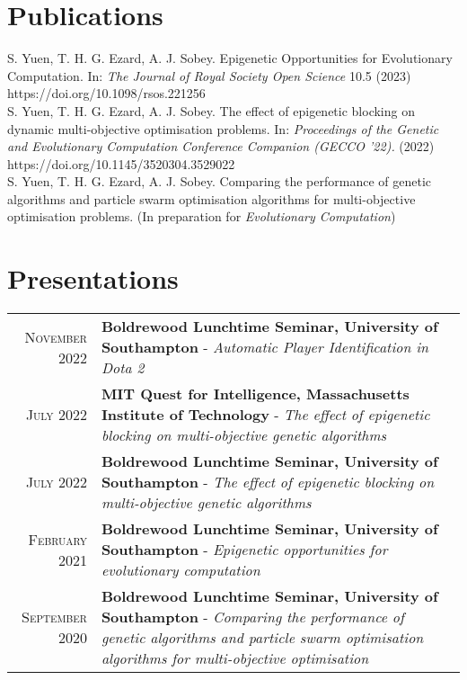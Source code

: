 \documentclass{article}
\begin{document}
\section*{Publications}
S. Yuen, T. H. G. Ezard, A. J. Sobey.
Epigenetic Opportunities for Evolutionary Computation. 
In: \textit{The Journal of Royal Society Open Science} 10.5 (2023) 
https://doi.org/10.1098/rsos.221256
\\

S. Yuen, T. H. G. Ezard, A. J. Sobey.
The effect of epigenetic blocking on dynamic multi-objective optimisation problems. 
In: \textit{Proceedings of the Genetic and Evolutionary Computation Conference Companion 
(GECCO ’22).} (2022)
https://doi.org/10.1145/3520304.3529022
\\

S. Yuen, T. H. G. Ezard, A. J. Sobey. Comparing the performance of
  genetic algorithms and particle swarm optimisation algorithms for
  multi-objective optimisation problems.
  (In preparation for \textit{Evolutionary Computation})


\section*{Presentations}
\renewcommand{\arraystretch}{1.35}
\begin{tabular}{r|p{13cm}}
\textsc{November 2022} & \textbf{Boldrewood Lunchtime Seminar, University of Southampton} - 
\textit{Automatic Player Identification in Dota 2}
\\
\textsc{July 2022} & \textbf{MIT Quest for Intelligence, Massachusetts Institute of Technology} - 
\textit{The effect of epigenetic blocking on multi-objective genetic algorithms}
\\
\textsc{July 2022} & \textbf{Boldrewood Lunchtime Seminar, University of Southampton} - 
\textit{The effect of epigenetic blocking on multi-objective genetic algorithms}
\\
\textsc{February 2021} & \textbf{Boldrewood Lunchtime Seminar, University of Southampton} - 
\textit{Epigenetic opportunities for evolutionary computation}
\\
\textsc{September 2020} & \textbf{Boldrewood Lunchtime Seminar, University of Southampton} - 
\textit{Comparing the performance of genetic algorithms and particle swarm optimisation algorithms for multi-objective optimisation}
\end{tabular}
\renewcommand{\arraystretch}{1}
\end{document}
